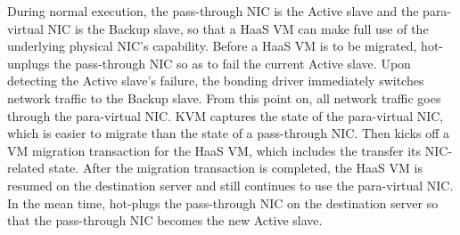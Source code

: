 During normal execution, the pass-through NIC is the Active slave and the para-virtual NIC is the Backup slave,
so that a HaaS VM can make full use of the underlying physical NIC's capability.
Before a HaaS VM is to be migrated, \na hot-unplugs the pass-through NIC so as to fail the current Active slave.
Upon detecting the Active slave's failure, the bonding driver immediately switches network traffic to the Backup slave.
From this point on, all network traffic goes through the para-virtual NIC. 
KVM captures the state of the para-virtual NIC, which is easier to migrate than the state of a pass-through NIC.
Then \na kicks off a VM migration transaction for the HaaS VM, which includes the transfer its NIC-related state.
After the migration transaction is completed, the HaaS VM is resumed on the destination server and still continues to use the para-virtual NIC.
In the mean time, \na hot-plugs the pass-through NIC on the destination  server 
so that the pass-through NIC becomes the new Active slave.


